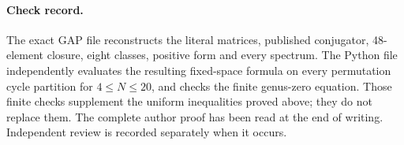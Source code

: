 \paragraph{Check record.}
The exact GAP file  reconstructs the
literal matrices, published conjugator, 48-element closure, eight
classes, positive form and every spectrum. The Python file
 independently evaluates the resulting
fixed-space formula on every permutation cycle partition for
\(4\le N\le20\), and checks the finite genus-zero equation.
Those finite checks supplement the uniform inequalities proved above;
they do not replace them. The complete author proof has been read at
the end of writing. Independent review is recorded separately when it
occurs.
